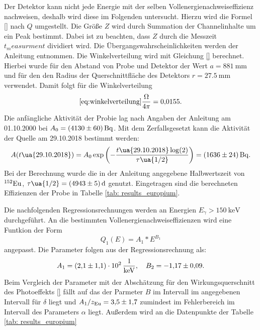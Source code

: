 Der Detektor kann nicht jede Energie mit der selben Vollenergienachweiseffizienz
nachweisen, deshalb wird diese im Folgenden untersucht. Hierzu wird die Formel
\eqref{} nach $Q$ umgestellt. Die Größe $Z$ wird durch Summation der Channelinhalte
um ein Peak bestimmt. Dabei ist zu beachten, dass $Z$ durch die Messzeit $t_measurment$
dividiert wird. Die Übergangswahrscheinlichkeiten werden der Anleitung \cite{anleitungV18}
entnommen. Die Winkelverteilung wird mit Gleichung \eqref{} berechnet. Hierbei wurde
für den Abstand von Probe und Detektor der Wert $a=\SI{881}{\milli\meter}$ und für den
den Radius der Querschnittfläche des Detektors $r=\SI{27.5}{\milli\meter}$
verwendet. Damit folgt für die Winkelverteilung
\begin{equation}
  \eqref{eq:winkelverteilung}
  \frac{\Omega}{4\pi}=\num{0.0155}.
\end{equation}
Die anfängliche Aktivität der Probie lag nach Angaben der Anleitung \cite{anleitungV18}
am 01.10.2000 bei $A_0=\SI{4130\pm60}{\becquerel}$. Mit dem Zerfallsgesetzt kann die
Aktivität der Quelle am 29.10.2018 bestimmt werden:
\begin{equation}
  A(t\ua{29.10.2018})=A_0\exp\left(-\frac{t\ua{29.10.2018}\log(2)}{\tau\ua{1/2}}\right) = \SI{1636\pm24}{\becquerel}.
\end{equation}
Bei der Berechnung wurde die in der Anleitung \cite{anleitungV18} angegebene
Halbwertszeit von $^{152}\ce{Eu}$, $\tau\ua{1/2}=\SI{4943 \pm 5 }{\day}$ genutzt.
Eingetragen sind die berechneten Effizienzen der Probe in Tabelle \ref{tab: results_europium}.

Die nachfolgenden Regressionsrechnungen werden an Energien $E_\gamma>\SI{150}{\kilo\eV}$
durchgeführt.
An die bestimmten Vollenergienachweiseffizienzen wird eine Funtkion der Form
\begin{equation*}
  Q_1(E)=A_1*E^{B_1}
\end{equation*}
angepasst. Die Parameter folgen aus der Regressionsrechnung als:
\begin{equation}
\label{eq:effizienz_Q_1}
A_1 = \SI{2.1\pm1.1 e2}{\per\kilo\eV}, \quad B_2=\num{-1.17\pm 0.09}.
\end{equation}
Beim Vergleich der Parameter mit der Abschätzung für den Wirkungsquerschnitt
des Photoeffekts \eqref{} fällt auf das der Parmeter $B$ im Intervall im angegebenen
Intervall für $\delta$ liegt und $A_1/z_{\ce{Eu}}=\num{3.5\pm1.7}$ zumindest im
Fehlerbereich im Intervall des Parameters $\alpha$ liegt.
Außerdem wird an die Datenpunkte der Tabelle \ref{tab: results_europium}
